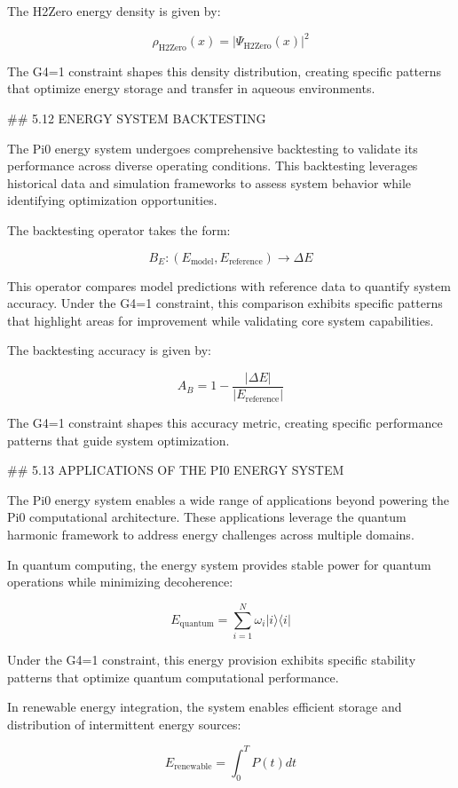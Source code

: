The H2Zero energy density is given by:

$$\rho_{\text{H2Zero}}(x) = |\Psi_{\text{H2Zero}}(x)|^2$$

The G4=1 constraint shapes this density distribution, creating specific patterns that optimize energy storage and transfer in aqueous environments.

## 5.12 ENERGY SYSTEM BACKTESTING

The Pi0 energy system undergoes comprehensive backtesting to validate its performance across diverse operating conditions. This backtesting leverages historical data and simulation frameworks to assess system behavior while identifying optimization opportunities.

The backtesting operator takes the form:

$$B_E: (E_{\text{model}}, E_{\text{reference}}) \rightarrow \Delta E$$

This operator compares model predictions with reference data to quantify system accuracy. Under the G4=1 constraint, this comparison exhibits specific patterns that highlight areas for improvement while validating core system capabilities.

The backtesting accuracy is given by:

$$A_B = 1 - \frac{|\Delta E|}{|E_{\text{reference}}|}$$

The G4=1 constraint shapes this accuracy metric, creating specific performance patterns that guide system optimization.

## 5.13 APPLICATIONS OF THE PI0 ENERGY SYSTEM

The Pi0 energy system enables a wide range of applications beyond powering the Pi0 computational architecture. These applications leverage the quantum harmonic framework to address energy challenges across multiple domains.

In quantum computing, the energy system provides stable power for quantum operations while minimizing decoherence:

$$E_{\text{quantum}} = \sum_{i=1}^{N} \omega_i |i\rangle \langle i|$$

Under the G4=1 constraint, this energy provision exhibits specific stability patterns that optimize quantum computational performance.

In renewable energy integration, the system enables efficient storage and distribution of intermittent energy sources:

$$E_{\text{renewable}} = \int_0^T P(t) dt$$

